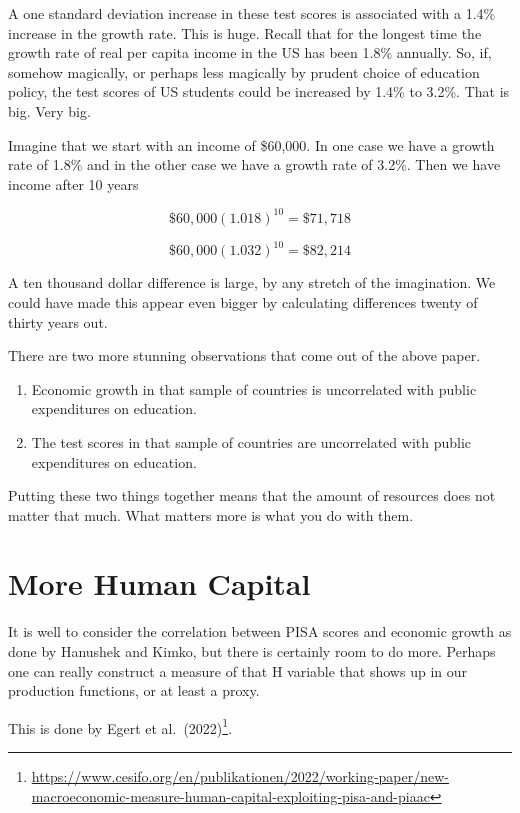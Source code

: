 \documentclass[
]{book}
\providecommand{\tightlist}{%
  \setlength{\itemsep}{0pt}\setlength{\parskip}{0pt}}
\begin{document}
A one standard deviation increase in these test scores is associated with a 1.4\% increase in the growth rate. This is huge. Recall that for the longest time the growth rate of real per capita income in the US has been 1.8\% annually. So, if, somehow magically, or perhaps less magically by prudent choice of education policy, the test scores of US students could be increased by 1.4\% to 3.2\%. That is big. Very big.

Imagine that we start with an income of \$60,000. In one case we have a growth rate of 1.8\% and in the other case we have a growth rate of 3.2\%. Then we have income after 10 years

\[\$60,000 (1.018)^{10} = \$71,718 \]

\[\$60,000 (1.032)^{10} = \$82,214\]

A ten thousand dollar difference is large, by any stretch of the imagination. We could have made this appear even bigger by calculating differences twenty of thirty years out.

There are two more stunning observations that come out of the above paper.

\begin{enumerate}
\def\labelenumi{\arabic{enumi}.}
\tightlist
\item
  Economic growth in that sample of countries is uncorrelated with public expenditures on education.
\item
  The test scores in that sample of countries are uncorrelated with public expenditures on education.
\end{enumerate}

Putting these two things together means that the amount of resources does not matter that much. What matters more is what you do with them.

\hypertarget{more-human-capital}{%
\section{More Human Capital}\label{more-human-capital}}

It is well to consider the correlation between PISA scores and economic growth as done by Hanushek and Kimko, but there is certainly room to do more. Perhaps one can really construct a measure of that H variable that shows up in our production functions, or at least a proxy.

This is done by Egert et al.~(2022)\footnote{\url{https://www.cesifo.org/en/publikationen/2022/working-paper/new-macroeconomic-measure-human-capital-exploiting-pisa-and-piaac}}.
\end{document}
